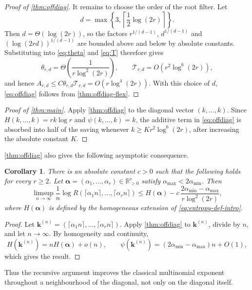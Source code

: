 \documentclass[11pt]{article}
\newtheorem{corollary}[theorem]{Corollary}
\theoremstyle{definition}
\newcommand{\R}{\mathbb R}
\newcommand{\kk}{\mathbf k}
\newcommand{\Ent}{H}
\newcommand{\pot}{\psi}
\begin{document}
\begin{proof}[Proof of \cref{thm:offdiag}]
It remains to choose the order of the root filter.  Let
\[
 d=\max\left\{3,\left\lceil\frac12\log(2r)\right\rceil\right\}.
\]
Then $d=\Theta(\log(2r))$, so the factors $r^{1/(d-1)}$, $d^{1/(d-1)}$ and
$(\log(2rd))^{1/(d-1)}$ are bounded above and below by absolute constants.
Substituting into \eqref{eq:theta} and \eqref{eq:T} therefore gives
\[
 \theta_{r,d}=\Theta\!\left(\frac1{r\log^2(2r)}\right),
 \qquad
 \mathcal T_{r,d}=O(r^2\log^6(2r)),
\]
and hence $A_{r,d}\le C\theta_{r,d}\mathcal T_{r,d}=O(r\log^4(2r))$.  With
this choice of $d$, \eqref{eq:offdiag} follows from \cref{thm:offdiag-flex}.
\end{proof}

\begin{proof}[Proof of \cref{thm:main}]
Apply \cref{thm:offdiag} to the diagonal vector $(k,\ldots,k)$.  Since
$\Ent(k,\ldots,k)=rk\log r$ and $\pot(k,\ldots,k)=k$, the additive term in
\eqref{eq:offdiag} is absorbed into half of the saving whenever
$k\ge K r^2\log^6(2r)$, after increasing the absolute constant $K$.
\end{proof}

\cref{thm:offdiag} also gives the following asymptotic consequence.

\begin{corollary}\label{cor:offdiag}
There is an absolute constant $c>0$ such that the following holds for every
$r\ge2$.  Let $\boldsymbol\alpha=(\alpha_1,\ldots,\alpha_r)\in\R_{>0}^r$
satisfy $\alpha_{\max}<2\alpha_{\min}$.  Then
\[
 \limsup_{n\to\infty}\frac1n
 \log R(\lceil\alpha_1n\rceil,\ldots,\lceil\alpha_rn\rceil)
 \le \Ent(\boldsymbol\alpha)
 -c\,\frac{2\alpha_{\min}-\alpha_{\max}}{r\log^2(2r)},
\]
where $\Ent(\boldsymbol\alpha)$ is defined by the homogeneous extension of
\eqref{eq:entropy-def-intro}.
\end{corollary}

\begin{proof}
Let $\kk^{(n)}=(\lceil\alpha_1n\rceil,\ldots,\lceil\alpha_rn\rceil)$.
Apply \cref{thm:offdiag} to $\kk^{(n)}$, divide by $n$, and let $n\to\infty$.
By homogeneity and continuity,
\[
 \Ent(\kk^{(n)})=n\Ent(\boldsymbol\alpha)+o(n),
 \qquad
 \pot(\kk^{(n)})=(2\alpha_{\min}-\alpha_{\max})n+O(1),
\]
which gives the result.
\end{proof}

Thus the recursive argument improves the classical multinomial exponent
throughout a neighbourhood of the diagonal, not only on the diagonal
itself.
\end{document}
